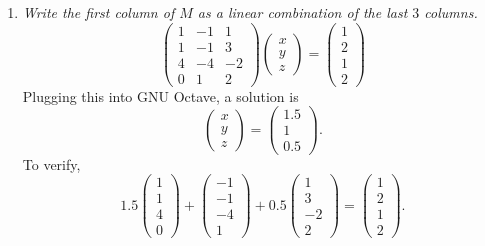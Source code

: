 \documentclass[12pt]{article}
\begin{document}
\begin{enumerate}[label=(\alph*)]
	\item \textit{Write the first column of $M$ as a linear combination of
	the last $3$ columns.}
	\begin{equation*}
		\begin{pmatrix}
			1 & -1 & 1 \\
			1 & -1 & 3 \\
			4 & -4 & -2 \\
			0 & 1 & 2
		\end{pmatrix}
		\begin{pmatrix} x \\ y \\ z \end{pmatrix}
		=
		\begin{pmatrix}
			1 \\ 2 \\ 1 \\ 2
		\end{pmatrix}
	\end{equation*}
	Plugging this into GNU Octave, a solution is
	\begin{equation*}
		\begin{pmatrix} x \\ y \\ z \end{pmatrix}
		=
		\begin{pmatrix} 1.5 \\ 1 \\ 0.5 \end{pmatrix}
		.
	\end{equation*}
	To verify,
	\begin{equation*}
		\boxed{
			1.5 \begin{pmatrix} 1 \\ 1 \\ 4 \\ 0 \end{pmatrix}
			+
			\begin{pmatrix} -1 \\ -1 \\ -4 \\ 1 \end{pmatrix}
			+
			0.5 \begin{pmatrix} 1 \\ 3 \\ -2 \\ 2 \end{pmatrix}
			=
			\begin{pmatrix} 1 \\ 2 \\ 1 \\ 2 \end{pmatrix}
		}
		.
	\end{equation*}
\end{enumerate}
\end{document}
